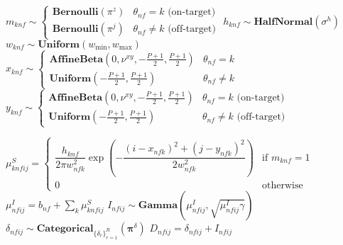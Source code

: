\begin{algorithm}
\begin{algorithmic}[1]
            \State $ m_{knf} \sim
                    \begin{cases}
                    \textbf{Bernoulli}(\pi^z) & \text{$\theta_{nf} = k$ (on-target)} \\
                    \textbf{Bernoulli}(\pi^j) & \text{$\theta_{nf} \neq k$ (off-target)}
                    \end{cases} $
                \State $h_{knf} \sim \textbf{HalfNormal}(\sigma^h)$
                \State $w_{knf} \sim \textbf{Uniform}(w_{\min}, w_{\max})$
                \State $ x_{knf} \sim
                        \begin{cases}
                        \textbf{AffineBeta}(0, \nu^{xy}, -\frac{P+1}{2}, \frac{P+1}{2}) & \text{$\theta_{nf} = k$} \\
                        \textbf{Uniform}(-\frac{P+1}{2}, \frac{P+1}{2}) & \text{$\theta_{nf} \neq k$}
                        \end{cases}$
                \State $ y_{knf} \sim
                        \begin{cases}
                        \textbf{AffineBeta}(0, \nu^{xy}, -\frac{P+1}{2}, \frac{P+1}{2}) & \text{$\theta_{nf} = k$ (on-target)} \\
                        \textbf{Uniform}(-\frac{P+1}{2}, \frac{P+1}{2}) & \text{$\theta_{nf} \neq k$ (off-target)}
                        \end{cases}$
            \EndIf
        \EndFor
            
                \State $\mu^{S}_{knfij} =
                        \begin{cases}
                            \dfrac{h_{knf}}{2 \pi w^2_{nfk}} \exp{\left ( -\dfrac{(i-x_{nfk})^2 + (j-y_{nfk})^2}{2w^2_{nfk}} \right)} & \text{if $m_{knf} = 1$} \\
                            0 & \text{otherwise}
                        \end{cases}$
            \EndFor
            \State $\mu^I_{nfij} = b_{nf} + \sum_k \mu^S_{knfij}$
            \State $I_{nfij} \sim \textbf{Gamma} (\mu^I_{nfij}, \sqrt{\mu^I_{nfij} \gamma})$
            \State $\delta_{nfij} \sim \textbf{Categorical}_{\{ \delta_r \}^R_{r=1}}(\bm{\pi}^\delta)$
            \State \Return $D_{nfij} = \delta_{nfij} + I_{nfij}$
        \EndFor
    \EndFor
\EndFor
\end{algorithmic}
\end{algorithm}